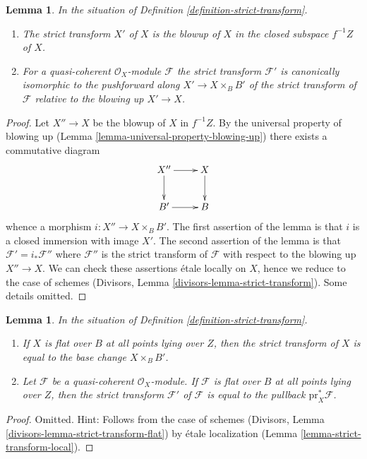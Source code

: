 \documentclass{stacks-project}
\theoremstyle{plain}
\newtheorem{lemma}[subsection]{Lemma}
\theoremstyle{definition}
\theoremstyle{remark}
\numberwithin{equation}{subsection}
\begin{document}
\begin{lemma}
\label{lemma-strict-transform}
In the situation of Definition \ref{definition-strict-transform}.
\begin{enumerate}
\item The strict transform $X'$ of $X$ is the blowup of $X$ in the closed
subspace $f^{-1}Z$ of $X$.
\item For a quasi-coherent $\mathcal{O}_X$-module $\mathcal{F}$ the
strict transform $\mathcal{F}'$ is canonically isomorphic to
the pushforward along $X' \to X \times_B B'$ of the strict transform of
$\mathcal{F}$ relative to the blowing up $X' \to X$.
\end{enumerate}
\end{lemma}

\begin{proof}
Let $X'' \to X$ be the blowup of $X$ in $f^{-1}Z$. By the universal
property of blowing up (Lemma \ref{lemma-universal-property-blowing-up})
there exists a commutative diagram
$$
\xymatrix{
X'' \ar[r] \ar[d] & X \ar[d] \\
B' \ar[r] & B
}
$$
whence a morphism $i : X'' \to X \times_B B'$. The first assertion
of the lemma is that $i$ is a closed immersion with image $X'$.
The second assertion of the lemma is that $\mathcal{F}' = i_*\mathcal{F}''$
where $\mathcal{F}''$ is the strict transform of $\mathcal{F}$ with
respect to the blowing up $X'' \to X$. We can check these assertions
\'etale locally on $X$, hence we reduce to the case of schemes
(Divisors, Lemma \ref{divisors-lemma-strict-transform}).
Some details omitted.
\end{proof}

\begin{lemma}
\label{lemma-strict-transform-flat}
In the situation of Definition \ref{definition-strict-transform}.
\begin{enumerate}
\item If $X$ is flat over $B$ at all points lying over $Z$, then
the strict transform of $X$ is equal to the base change $X \times_B B'$.
\item Let $\mathcal{F}$ be a quasi-coherent $\mathcal{O}_X$-module.
If $\mathcal{F}$ is flat over $B$ at all points lying over $Z$, then
the strict transform $\mathcal{F}'$ of $\mathcal{F}$ is equal to the
pullback $\text{pr}_X^*\mathcal{F}$.
\end{enumerate}
\end{lemma}

\begin{proof}
Omitted. Hint: Follows from the case of schemes
(Divisors, Lemma \ref{divisors-lemma-strict-transform-flat})
by \'etale localization
(Lemma \ref{lemma-strict-transform-local}).
\end{proof}
\end{document}
